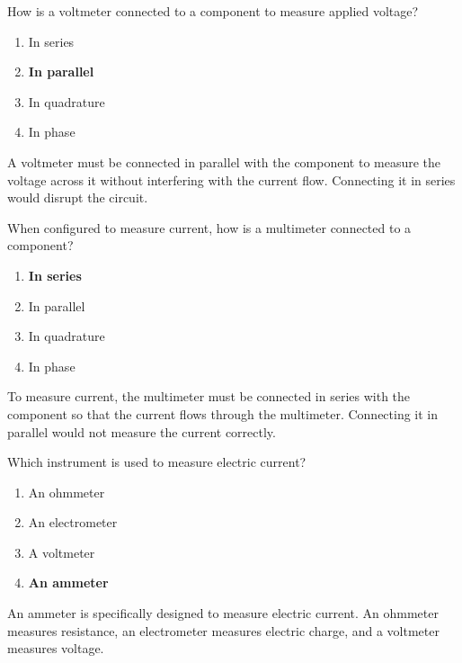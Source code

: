 \begin{tcolorbox}[colback=gray!10!white,colframe=black!75!black,title={T7D02}]
    How is a voltmeter connected to a component to measure applied voltage?
    \begin{enumerate}[label=\Alph*),noitemsep]
        \item In series
        \item \textbf{In parallel}
        \item In quadrature
        \item In phase
    \end{enumerate}
\end{tcolorbox}
A voltmeter must be connected in parallel with the component to measure the voltage across it without interfering with the current flow. Connecting it in series would disrupt the circuit.

\begin{tcolorbox}[colback=gray!10!white,colframe=black!75!black,title={T7D03}]
    When configured to measure current, how is a multimeter connected to a component?
    \begin{enumerate}[label=\Alph*),noitemsep]
        \item \textbf{In series}
        \item In parallel
        \item In quadrature
        \item In phase
    \end{enumerate}
\end{tcolorbox}
To measure current, the multimeter must be connected in series with the component so that the current flows through the multimeter. Connecting it in parallel would not measure the current correctly.

\begin{tcolorbox}[colback=gray!10!white,colframe=black!75!black,title={T7D04}]
    Which instrument is used to measure electric current?
    \begin{enumerate}[label=\Alph*),noitemsep]
        \item An ohmmeter
        \item An electrometer
        \item A voltmeter
        \item \textbf{An ammeter}
    \end{enumerate}
\end{tcolorbox}
An ammeter is specifically designed to measure electric current. An ohmmeter measures resistance, an electrometer measures electric charge, and a voltmeter measures voltage.

